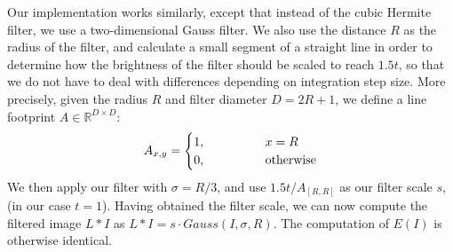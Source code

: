 \noindent Our implementation works similarly, except that instead of the cubic Hermite filter, we use a two-dimensional Gauss filter.
We also use the distance $R$ as the radius of the filter, and calculate a small segment of a straight line in order to determine
how the brightness of the filter should be scaled to reach $1.5t$, so that we do not have to deal with differences depending on integration step size. 
More precisely, given the radius $R$ and filter diameter $D=2R+1$, we define a line footprint $A \in \mathbb{R}^{D\times D}$:
\begin{equation*}
    A_{x,y} = \begin{cases}
        1, \kern4em & x = R\\
        0, \kern4em & \text{otherwise}
    \end{cases}
\end{equation*}
We then apply our filter with $\sigma = R/3$, and use $1.5t  / A_{[R,R]}$ as our filter scale $s$, (in our case $t=1$).
Having obtained the filter scale, we can now compute the filtered image $L\ast I$ as $L\ast I = s \cdot Gauss(I, \sigma, R)$.
The computation of $E(I)$ is otherwise identical.

